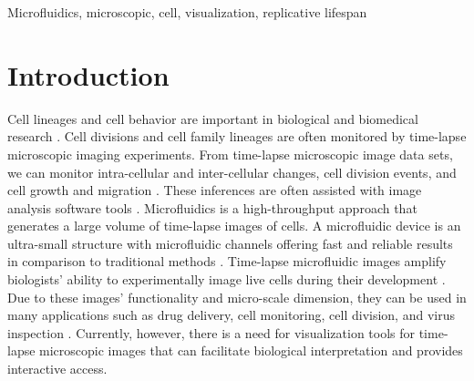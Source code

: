 \documentclass[conference]{IEEEtran}
\begin{document}
\begin{IEEEkeywords}
Microfluidics, microscopic, cell, visualization, replicative lifespan 
\end{IEEEkeywords}

\section{Introduction}

Cell lineages and cell behavior are important in biological and biomedical research \cite{r1,r2,r3}. Cell divisions and cell family lineages are often monitored by time-lapse microscopic imaging experiments.  
From time-lapse microscopic image data sets, we can monitor intra-cellular and inter-cellular changes, cell division events, and cell growth and migration \cite{r4}. These inferences are often assisted with image analysis software tools \cite{r5,r6,r7}.
Microfluidics is a high-throughput approach that generates a large volume of time-lapse images of cells. A microfluidic device is an ultra-small structure with microfluidic channels offering fast and reliable results in comparison to traditional methods \cite {r8,r9}. Time-lapse microfluidic images amplify biologists' ability to experimentally image live cells during their development \cite{r10}. Due to these images' functionality and micro-scale dimension, they can be used in many applications such as drug delivery, cell monitoring, cell division, and virus inspection \cite{r11,r12}. Currently, however, there is a need for visualization tools for time-lapse microscopic images that can facilitate biological interpretation and provides interactive access.  
\end{document}
